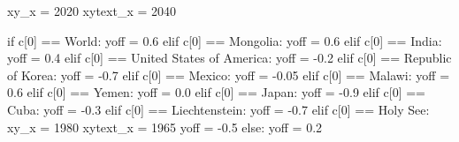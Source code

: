 \documentclass[
  letterpaper,
  DIV=11,
  numbers=noendperiod]{scrreprt}
\newenvironment{Shaded}{\begin{snugshade}}{\end{snugshade}}
\newcommand{\ControlFlowTok}[1]{\textcolor[rgb]{0.00,0.23,0.31}{#1}}
\newcommand{\DecValTok}[1]{\textcolor[rgb]{0.68,0.00,0.00}{#1}}
\newcommand{\FloatTok}[1]{\textcolor[rgb]{0.68,0.00,0.00}{#1}}
\newcommand{\NormalTok}[1]{\textcolor[rgb]{0.00,0.23,0.31}{#1}}
\newcommand{\OperatorTok}[1]{\textcolor[rgb]{0.37,0.37,0.37}{#1}}
\newcommand{\StringTok}[1]{\textcolor[rgb]{0.13,0.47,0.30}{#1}}
\begin{document}
\begin{Shaded}
\begin{Highlighting}[]
\NormalTok{    xy\_x }\OperatorTok{=} \DecValTok{2020}
\NormalTok{    xytext\_x }\OperatorTok{=} \DecValTok{2040}
    
    \ControlFlowTok{if}\NormalTok{ c[}\DecValTok{0}\NormalTok{] }\OperatorTok{==} \StringTok{\textquotesingle{}World\textquotesingle{}}\NormalTok{:}
\NormalTok{        yoff }\OperatorTok{=} \FloatTok{0.6}
    \ControlFlowTok{elif}\NormalTok{ c[}\DecValTok{0}\NormalTok{] }\OperatorTok{==} \StringTok{\textquotesingle{}Mongolia\textquotesingle{}}\NormalTok{:}
\NormalTok{        yoff }\OperatorTok{=} \FloatTok{0.6}
    \ControlFlowTok{elif}\NormalTok{ c[}\DecValTok{0}\NormalTok{] }\OperatorTok{==} \StringTok{\textquotesingle{}India\textquotesingle{}}\NormalTok{:}
\NormalTok{        yoff }\OperatorTok{=} \FloatTok{0.4}
    \ControlFlowTok{elif}\NormalTok{ c[}\DecValTok{0}\NormalTok{] }\OperatorTok{==} \StringTok{\textquotesingle{}United States of America\textquotesingle{}}\NormalTok{:}
\NormalTok{        yoff }\OperatorTok{=} \OperatorTok{{-}}\FloatTok{0.2}
    \ControlFlowTok{elif}\NormalTok{ c[}\DecValTok{0}\NormalTok{] }\OperatorTok{==} \StringTok{\textquotesingle{}Republic of Korea\textquotesingle{}}\NormalTok{:}
\NormalTok{        yoff }\OperatorTok{=} \OperatorTok{{-}}\FloatTok{0.7}
    \ControlFlowTok{elif}\NormalTok{ c[}\DecValTok{0}\NormalTok{] }\OperatorTok{==} \StringTok{\textquotesingle{}Mexico\textquotesingle{}}\NormalTok{:}
\NormalTok{        yoff }\OperatorTok{=} \OperatorTok{{-}}\FloatTok{0.05}
    \ControlFlowTok{elif}\NormalTok{ c[}\DecValTok{0}\NormalTok{] }\OperatorTok{==} \StringTok{\textquotesingle{}Malawi\textquotesingle{}}\NormalTok{:}
\NormalTok{        yoff }\OperatorTok{=} \FloatTok{0.6}
    \ControlFlowTok{elif}\NormalTok{ c[}\DecValTok{0}\NormalTok{] }\OperatorTok{==} \StringTok{\textquotesingle{}Yemen\textquotesingle{}}\NormalTok{:}
\NormalTok{        yoff }\OperatorTok{=} \FloatTok{0.0}
    \ControlFlowTok{elif}\NormalTok{ c[}\DecValTok{0}\NormalTok{] }\OperatorTok{==} \StringTok{\textquotesingle{}Japan\textquotesingle{}}\NormalTok{:}
\NormalTok{        yoff }\OperatorTok{=} \OperatorTok{{-}}\FloatTok{0.9}
    \ControlFlowTok{elif}\NormalTok{ c[}\DecValTok{0}\NormalTok{] }\OperatorTok{==} \StringTok{\textquotesingle{}Cuba\textquotesingle{}}\NormalTok{:}
\NormalTok{        yoff }\OperatorTok{=} \OperatorTok{{-}}\FloatTok{0.3}
    \ControlFlowTok{elif}\NormalTok{ c[}\DecValTok{0}\NormalTok{] }\OperatorTok{==} \StringTok{\textquotesingle{}Liechtenstein\textquotesingle{}}\NormalTok{:}
\NormalTok{        yoff }\OperatorTok{=} \OperatorTok{{-}}\FloatTok{0.7}
    \ControlFlowTok{elif}\NormalTok{ c[}\DecValTok{0}\NormalTok{] }\OperatorTok{==} \StringTok{\textquotesingle{}Holy See\textquotesingle{}}\NormalTok{:}
\NormalTok{        xy\_x }\OperatorTok{=} \DecValTok{1980}
\NormalTok{        xytext\_x }\OperatorTok{=} \DecValTok{1965}
\NormalTok{        yoff }\OperatorTok{=} \OperatorTok{{-}}\FloatTok{0.5}
    \ControlFlowTok{else}\NormalTok{:}
\NormalTok{        yoff }\OperatorTok{=} \FloatTok{0.2}


\end{Highlighting}
\end{Shaded}
\end{document}
